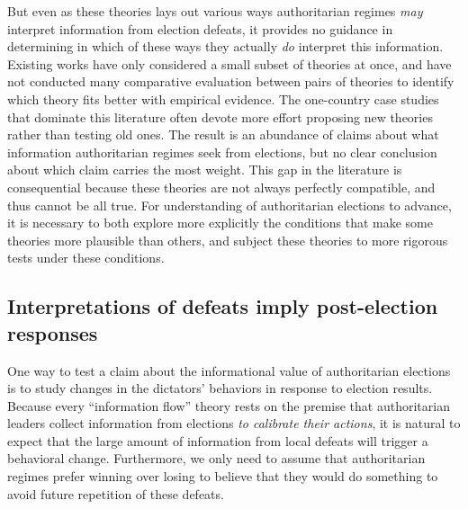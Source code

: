 \documentclass[12pt]{article}\usepackage[]{graphicx}\usepackage[]{color}
\newcommand{\1}{\mathbbm{1}}
\begin{document}
But even as these theories lays out various ways authoritarian regimes \textit{may} interpret information from election defeats, it provides no guidance in determining in which of these ways they actually \textit{do} interpret this information. Existing works have only considered a small subset of theories at once, and have not conducted many comparative evaluation between pairs of theories to identify which theory fits better with empirical evidence. The one-country case studies that dominate this literature \citep{LustOkar2005, Geddes2005, Magaloni2006, Blaydes2008} often devote more effort proposing new theories rather than testing old ones. The result is an abundance of claims about what information authoritarian regimes seek from elections, but no clear conclusion about which claim carries the most weight. This gap in the literature is consequential because these theories are not always perfectly compatible, and thus cannot be all true. For understanding of authoritarian elections to advance, it is necessary to both explore more explicitly the conditions that make some theories more plausible than others, and subject these theories to more rigorous tests under these conditions.

\subsection{Interpretations of defeats imply post-election responses}

One way to test a claim about the informational value of authoritarian elections is to study changes in the dictators' behaviors in response to election results. Because every ``information flow'' theory rests on the premise that authoritarian leaders collect information from elections \textit{to calibrate their actions}, it is natural to expect that the large amount of information from local defeats will trigger a behavioral change. Furthermore, we only need to assume that authoritarian regimes prefer winning over losing to believe that they would do something to avoid future repetition of these defeats. 
\end{document}
